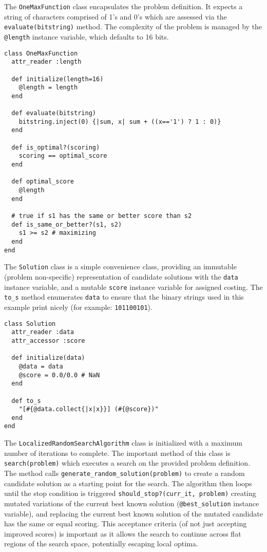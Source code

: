 The \texttt{OneMaxFunction} class encapsulates the problem definition. It expects a string of characters comprised of 1's and 0's which are assessed via the \texttt{evaluate(bitstring)} method. The complexity of the problem is managed by the \texttt{@length} instance variable, which defaults to 16 bits.

\begin{lstlisting}
class OneMaxFunction
  attr_reader :length

  def initialize(length=16)
    @length = length
  end

  def evaluate(bitstring)
    bitstring.inject(0) {|sum, x| sum + ((x=='1') ? 1 : 0)}
  end  

  def is_optimal?(scoring)
    scoring == optimal_score
  end

  def optimal_score
    @length
  end
  
  # true if s1 has the same or better score than s2
  def is_same_or_better?(s1, s2)
    s1 >= s2 # maximizing
  end
end
\end{lstlisting}

The \texttt{Solution} class is a simple convenience class, providing an immutable (problem non-specific) representation of candidate solutions with the \texttt{data} instance variable, and a mutable \texttt{score} instance variable for assigned costing. The \texttt{to\_s} method enumerates \texttt{data} to ensure that the binary strings used in this example print nicely (for example: \texttt{101100101}). 

\begin{lstlisting}
class Solution
  attr_reader :data
  attr_accessor :score
  
  def initialize(data)
    @data = data
    @score = 0.0/0.0 # NaN
  end
  
  def to_s
    "[#{@data.collect{|x|x}}] (#{@score})"
  end    
end
\end{lstlisting}

The \texttt{LocalizedRandomSearchAlgorithm} class is initialized with a maximum number of iterations to complete. The important method of this class is \texttt{search(problem)} which executes a search on the provided problem definition. The method calls \texttt{generate\_random\_solution(problem)} to create a random candidate solution as a starting point for the search. The algorithm then loops until the stop condition is triggered \texttt{should\_stop?(curr\_it, problem)} creating mutated variations of the current best known solution (\texttt{@best\_solution} instance variable), and replacing the current best known solution of the mutated candidate has the same or equal scoring. This acceptance criteria (of not just accepting improved scores) is important as it allows the search to continue across flat regions of the search space, potentially escaping local optima.

